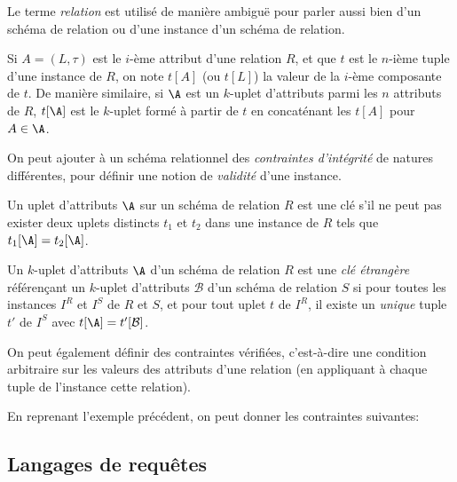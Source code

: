 \documentclass[french, toc]{../cs-classes/cs-classes}
\begin{document}
\begin{remarque}
    Le terme \emph{relation} est utilisé de manière ambiguë pour parler aussi bien d'un schéma de relation ou d'une instance d'un schéma de relation.
\end{remarque}

Si $A=(L, \tau)$ est le $i$-ème attribut d'une relation $R$, et que $t$ est le $n$-ième tuple d'une instance de $R$, on note $t[A]$ (ou $t[L]$) la valeur de la $i$-ème composante de $t$. De manière similaire, si $\A$ est un $k$-uplet d'attributs parmi les $n$ attributs de $R$, $t[\A]$ est le $k$-uplet formé à partir de $t$ en concaténant les $t[A]$ pour $A\in\A$.

On peut ajouter à un schéma relationnel des \emph{contraintes d'intégrité} de natures différentes, pour définir une notion de \emph{validité} d'une instance.
\begin{definition}[Clé]
    Un uplet d'attributs $\A$ sur un schéma de relation $R$ est une clé s'il ne peut pas exister deux uplets distincts $t_1$ et $t_2$ dans une instance de $R$ tels que $t_1[\A]=t_2[\A]$.
\end{definition}

\begin{definition}
    Un $k$-uplet d'attributs $\A$ d'un schéma de relation $R$ est une \emph{clé étrangère} référençant un $k$-uplet d'attributs $\mathcal{B}$ d'un schéma de relation $S$ si pour toutes les instances $I^R$ et $I^S$ de $R$ et $S$, et pour tout uplet $t$ de $I^R$, il existe un \emph{unique} tuple $t'$ de $I^S$ avec $t[\A]=t'[\mathcal{B}]$.
\end{definition}

On peut également définir des contraintes vérifiées, c'est-à-dire une condition arbitraire sur les valeurs des attributs d'une relation (en appliquant à chaque tuple de l'instance cette relation).

\begin{exemple}
    En reprenant l'exemple précédent, on peut donner les contraintes suivantes:
\end{exemple}


\subsection{Langages de requêtes}
\end{document}
